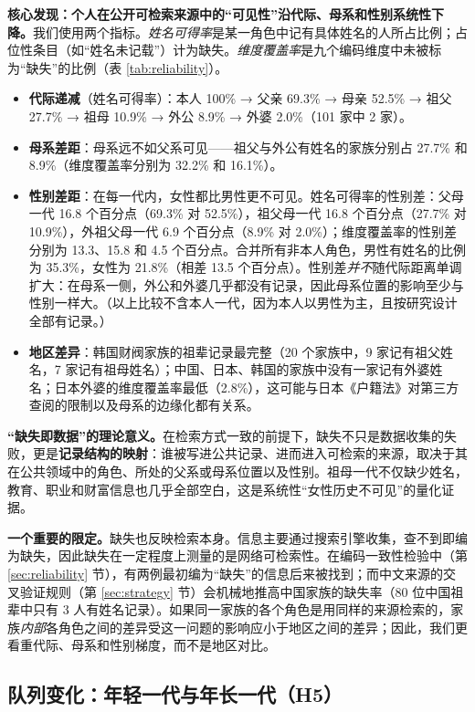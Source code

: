 \documentclass[UTF8,a4paper,11pt]{ctexart}
\begin{document}
\textbf{核心发现：个人在公开可检索来源中的“可见性”沿代际、母系和性别系统性下降。}我们使用两个指标。\emph{姓名可得率}是某一角色中记有具体姓名的人所占比例；占位性条目（如“姓名未记载”）计为缺失。\emph{维度覆盖率}是九个编码维度中未被标为“缺失”的比例（表 \ref{tab:reliability}）。

\begin{itemize}
\item \textbf{代际递减}（姓名可得率）：本人 100\% → 父亲 69.3\% → 母亲 52.5\% → 祖父 27.7\% → 祖母 10.9\% → 外公 8.9\% → 外婆 2.0\%（101 家中 2 家）。
\item \textbf{母系差距}：母系远不如父系可见——祖父与外公有姓名的家族分别占 27.7\% 和 8.9\%（维度覆盖率分别为 32.2\% 和 16.1\%）。
\item \textbf{性别差距}：在每一代内，女性都比男性更不可见。姓名可得率的性别差：父母一代 16.8 个百分点（69.3\% 对 52.5\%），祖父母一代 16.8 个百分点（27.7\% 对 10.9\%），外祖父母一代 6.9 个百分点（8.9\% 对 2.0\%）；维度覆盖率的性别差分别为 13.3、15.8 和 4.5 个百分点。合并所有非本人角色，男性有姓名的比例为 35.3\%，女性为 21.8\%（相差 13.5 个百分点）。性别差\emph{并不}随代际距离单调扩大：在母系一侧，外公和外婆几乎都没有记录，因此母系位置的影响至少与性别一样大。（以上比较不含本人一代，因为本人以男性为主，且按研究设计全部有记录。）
\item \textbf{地区差异}：韩国财阀家族的祖辈记录最完整（20 个家族中，9 家记有祖父姓名，7 家记有祖母姓名）；中国、日本、韩国的家族中没有一家记有外婆姓名；日本外婆的维度覆盖率最低（2.8\%），这可能与日本《户籍法》对第三方查阅的限制以及母系的边缘化都有关系。
\end{itemize}

\textbf{“缺失即数据”的理论意义。}在检索方式一致的前提下，缺失不只是数据收集的失败，更是\textbf{记录结构的映射}：谁被写进公共记录、进而进入可检索的来源，取决于其在公共领域中的角色、所处的父系或母系位置以及性别。祖母一代不仅缺少姓名，教育、职业和财富信息也几乎全部空白，这是系统性“女性历史不可见”的量化证据。

\textbf{一个重要的限定。}缺失也反映检索本身。信息主要通过搜索引擎收集，查不到即编为缺失，因此缺失在一定程度上测量的是网络可检索性。在编码一致性检验中（第 \ref{sec:reliability} 节），有两例最初编为“缺失”的信息后来被找到；而中文来源的交叉验证规则（第 \ref{sec:strategy} 节）会机械地推高中国家族的缺失率（80 位中国祖辈中只有 3 人有姓名记录）。如果同一家族的各个角色是用同样的来源检索的，家族\emph{内部}各角色之间的差异受这一问题的影响应小于地区之间的差异；因此，我们更看重代际、母系和性别梯度，而不是地区对比。

\subsection{队列变化：年轻一代与年长一代（H5）}
\end{document}
